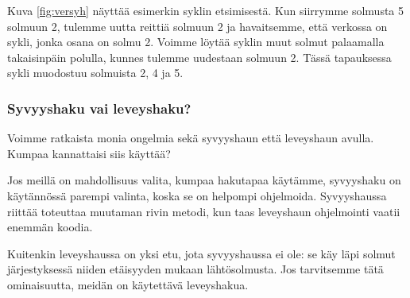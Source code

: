 Kuva \ref{fig:versyh} näyttää esimerkin syklin etsimisestä.
Kun siirrymme solmusta 5 solmuun 2, tulemme uutta reittiä solmuun 2
ja havaitsemme, että verkossa on sykli, jonka osana on solmu 2.
Voimme löytää syklin muut solmut palaamalla takaisinpäin
polulla, kunnes tulemme uudestaan solmuun 2.
Tässä tapauksessa sykli muodostuu solmuista 2, 4 ja 5.

\subsubsection{Syvyyshaku vai leveyshaku?}

Voimme ratkaista monia ongelmia sekä syvyyshaun että leveyshaun avulla.
Kumpaa kannattaisi siis käyttää?

Jos meillä on mahdollisuus valita, kumpaa hakutapaa käytämme,
syvyyshaku on käytännössä parempi valinta, koska se on helpompi ohjelmoida.
Syvyyshaussa riittää toteuttaa muutaman rivin metodi,
kun taas leveyshaun ohjelmointi vaatii enemmän koodia.

Kuitenkin leveyshaussa on yksi etu, jota syvyyshaussa ei ole:
se käy läpi solmut järjestyksessä niiden etäisyyden mukaan lähtösolmusta.
Jos tarvitsemme tätä ominaisuutta, meidän on käytettävä leveyshakua.